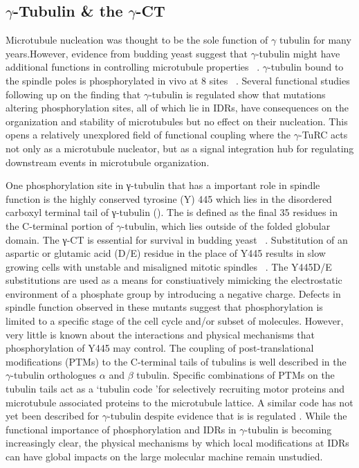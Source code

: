 \subsection{$\gamma$-Tubulin \& the $\gamma$-CT}

Microtubule nucleation was thought to be the sole function of $\gamma$ tubulin for many years.However, evidence from budding yeast suggest that $\gamma$-tubulin might have additional functions in controlling microtubule properties ~\cite{vogel2000carboxy,vogel2001phosphorylation, cuschieri2006gamma, nazarova2013cdk1}. $\gamma$-tubulin bound to the spindle poles is phosphorylated in vivo at  8 sites ~\cite{vogel2001phosphorylation,keck2011cell}.
Several functional studies following up on the finding that $\gamma$-tubulin is regulated show that mutations altering phosphorylation sites, all of which lie in IDRs, have consequences on the organization and stability of microtubules but no effect on their nucleation. This opens a relatively unexplored field of functional coupling where the $\gamma$-TuRC acts not only as a microtubule nucleator, but as a signal integration hub for regulating downstream events in microtubule organization.

One phosphorylation site in γ-tubulin that has a important role in spindle function is the highly conserved  tyrosine  (Y)  445  which lies in the  disordered  carboxyl  terminal  tail  of γ-tubulin  (\gct). The \gct{} is defined as the final 35 residues in the C-terminal portion of $\gamma$-tubulin, which lies outside of the folded globular domain. The  γ-CT is essential for survival in budding yeast  ~\cite{vogel2000carboxy}. Substitution of an aspartic or glutamic acid (D/E) residue in the place of Y445 results  in slow growing cells with unstable  and misaligned mitotic  spindles ~\cite{vogel2001phosphorylation}. The Y445D/E substitutions are used as a means for constiuatively mimicking the electrostatic  environment  of a phosphate  group  by introducing  a negative  charge. Defects in spindle function observed in these mutants suggest that phosphorylation is limited to a specific stage of the cell cycle and/or subset of molecules. However, very little  is known about  the interactions and physical mechanisms that  phosphorylation  of  Y445 may control.   The  coupling of post-translational modifications  (PTMs) to the C-terminal  tails of tubulins  is well described in the $\gamma$-tubulin orthologues  $\alpha$ and $\beta$ tubulin.  Specific combinations  of PTMs  on the tubulin  tails act as a  \lq tubulin code \rq for selectively recruiting  motor  proteins  and  microtubule  associated  proteins to the microtubule  lattice.  A similar code has not yet been described for $\gamma$-tubulin despite evidence that  is is regulated \vivo.  While the functional importance  of phosphorylation and IDRs in $\gamma$-tubulin is becoming increasingly clear, the physical mechanisms  by which local modifications  at  IDRs can have global impacts  on the large molecular machine remain unstudied.


